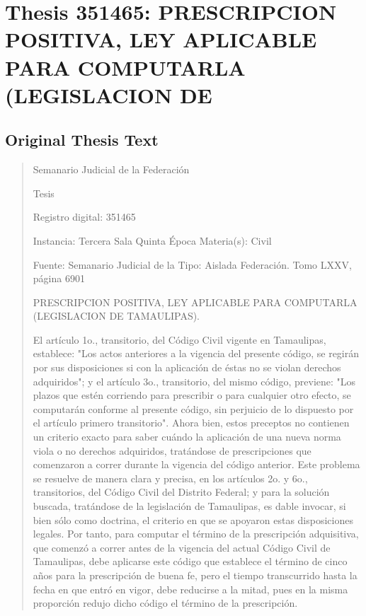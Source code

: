 \documentclass[11pt,a4paper]{article}
\begin{document}
\newpage

\section{Thesis 351465: PRESCRIPCION POSITIVA, LEY APLICABLE PARA COMPUTARLA (LEGISLACION DE}
\label{thesis:351465}

\subsection{Original Thesis Text}

\begin{quote}
                                                   Semanario Judicial de la Federación

                                                  Tesis

 Registro digital: 351465

 Instancia: Tercera Sala           Quinta Época                           Materia(s): Civil

                                   Fuente: Semanario Judicial de la       Tipo: Aislada
                                   Federación.
                                   Tomo LXXV, página 6901


PRESCRIPCION POSITIVA, LEY APLICABLE PARA COMPUTARLA (LEGISLACION DE
TAMAULIPAS).


El artículo 1o., transitorio, del Código Civil vigente en Tamaulipas, establece: "Los actos anteriores a
la vigencia del presente código, se regirán por sus disposiciones si con la aplicación de éstas no se
violan derechos adquiridos"; y el artículo 3o., transitorio, del mismo código, previene: "Los plazos
que estén corriendo para prescribir o para cualquier otro efecto, se computarán conforme al
presente código, sin perjuicio de lo dispuesto por el artículo primero transitorio". Ahora bien, estos
preceptos no contienen un criterio exacto para saber cuándo la aplicación de una nueva norma viola
o no derechos adquiridos, tratándose de prescripciones que comenzaron a correr durante la
vigencia del código anterior. Este problema se resuelve de manera clara y precisa, en los artículos
2o. y 6o., transitorios, del Código Civil del Distrito Federal; y para la solución buscada, tratándose de
la legislación de Tamaulipas, es dable invocar, si bien sólo como doctrina, el criterio en que se
apoyaron estas disposiciones legales. Por tanto, para computar el término de la prescripción
adquisitiva, que comenzó a correr antes de la vigencia del actual Código Civil de Tamaulipas, debe
aplicarse este código que establece el término de cinco años para la prescripción de buena fe, pero
el tiempo transcurrido hasta la fecha en que entró en vigor, debe reducirse a la mitad, pues en la
misma proporción redujo dicho código el término de la prescripción.



\end{quote}
\end{document}
